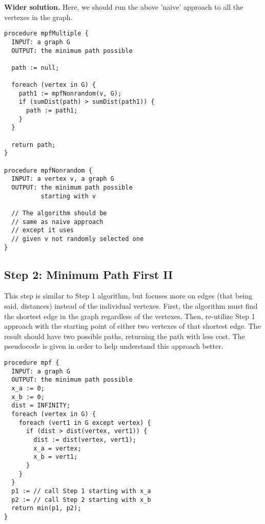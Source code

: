 \documentclass{acm_proc_article-sp}
\begin{document}
\begin{flushleft}
\textbf{Wider solution.} Here, we should run the above 'naive' approach to all the vertexes in the graph.
\end{flushleft}

\begin{lstlisting}
procedure mpfMultiple {
  INPUT: a graph G
  OUTPUT: the minimum path possible
  
  path := null;
  
  foreach (vertex in G) {
    path1 := mpfNonrandom(v, G);
    if (sumDist(path) > sumDist(path1)) {
      path := path1;
    }
  }
  
  return path;
}

procedure mpfNonrandom {
  INPUT: a vertex v, a graph G
  OUTPUT: the minimum path possible
          starting with v
  
  // The algorithm should be
  // same as naive approach
  // except it uses 
  // given v not randomly selected one
}
\end{lstlisting}

\subsection{Step 2: Minimum Path First II}
\begin{flushleft}
This step is similar to Step 1 algorithm, but focuses more on edges (that being said, distances) instead of the individual vertexes. First, the algorithm must find the shortest edge in the graph regardless of the vertexes. Then, re-utilize Step 1 approach with the starting point of either two vertexes of that shortest edge. The result should have two possible paths, returning the path with less cost. The pseudocode is given in order to help understand this approach better.
\end{flushleft}

\begin{lstlisting}
procedure mpf {
  INPUT: a graph G
  OUTPUT: the minimum path possible
  x_a := 0;
  x_b := 0;
  dist = INFINITY;
  foreach (vertex in G) {
    foreach (vert1 in G except vertex) {
      if (dist > dist(vertex, vert1)) {
        dist := dist(vertex, vert1);
        x_a = vertex;
        x_b = vert1;
      }
    }
  }
  p1 := // call Step 1 starting with x_a
  p2 := // call Step 2 starting with x_b
  return min(p1, p2);
}
\end{lstlisting}


\end{document}
